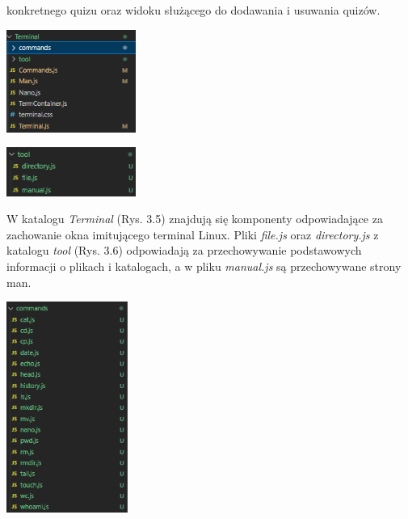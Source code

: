 \documentclass[10pt,a4paper]{report}
\begin{document}
\begin{adjustwidth}{2cm}{2cm}
\begin{minipage}{1\linewidth}
\end{minipage}
\begin{minipage}{1\linewidth}
  konkretnego quizu oraz widoku służącego do dodawania i usuwania quizów. 
\end{minipage}
\begin{multicols}{2}
\begin{minipage}{\linewidth}
\begin{center}
  \includegraphics[width=160px]{code/terminal.png}
\end{center}
\end{minipage}
\begin{minipage}{\linewidth}
\begin{center}
  \includegraphics[width=160px]{code/tool.png}
\end{center}
\end{minipage}
\end{multicols}
\begin{adjustwidth}{0cm}{0cm}
\begin{minipage}{\linewidth}
W katalogu \textit{Terminal} (Rys. 3.5) znajdują się komponenty odpowiadające za zachowanie okna imitującego terminal Linux. Pliki \textit{file.js} oraz \textit{directory.js} z katalogu \textit{tool} (Rys. 3.6) odpowiadają za przechowywanie podstawowych informacji o plikach i katalogach, a w pliku \textit{manual.js} są przechowywane strony man.\\
\end{minipage}
\begin{minipage}{\linewidth}
\begin{center}
  \includegraphics[width=150px]{code/commands.png}

\end{center}
\end{minipage}
\end{adjustwidth}
\end{adjustwidth}
\end{document}
